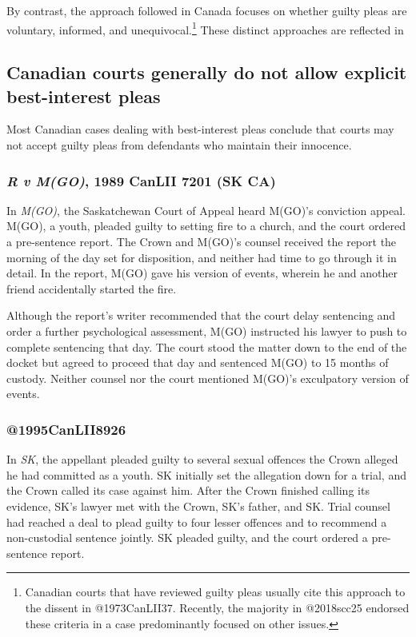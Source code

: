 By contrast, the approach followed in Canada focuses on whether guilty pleas are voluntary, informed, and unequivocal.\footnote{Canadian courts that have reviewed guilty pleas usually cite this approach to the dissent in @1973CanLII37. Recently, the majority in @2018scc25 endorsed these criteria in a case predominantly focused on other issues.} These distinct approaches are reflected in 

\subsection{Canadian courts generally do not allow explicit best-interest pleas}

Most Canadian cases dealing with best-interest pleas conclude that courts may not accept guilty pleas from defendants who maintain their innocence. 

\subsubsection{\textit{R v M(GO)}, 1989 CanLII 7201 (SK CA)}

In \textit{M(GO)}, the Saskatchewan Court of Appeal heard M(GO)'s conviction appeal. M(GO), a youth, pleaded guilty to setting fire to a church, and the court ordered a pre-sentence report. The Crown and M(GO)'s counsel received the report the morning of the day set for disposition, and neither had time to go through it in detail. In the report, M(GO) gave his version of events, wherein he and another friend accidentally started the fire. 

Although the report's writer recommended that the court delay sentencing and order a further psychological assessment, M(GO) instructed his lawyer to push to complete sentencing that day. The court stood the matter down to the end of the docket but agreed to proceed that day and sentenced M(GO) to 15 months of custody. Neither counsel nor the court mentioned M(GO)'s exculpatory version of events.





\subsubsection{@1995CanLII8926\\}

In \textit{SK}, the appellant pleaded guilty to several sexual offences the Crown alleged he had committed as a youth. SK initially set the allegation down for a trial, and the Crown called its case against him. After the Crown finished calling its evidence, SK's lawyer met with the Crown, SK's father, and SK. Trial counsel had reached a deal to plead guilty to four lesser offences and to recommend a non-custodial sentence jointly. SK pleaded guilty, and the court ordered a pre-sentence report.

